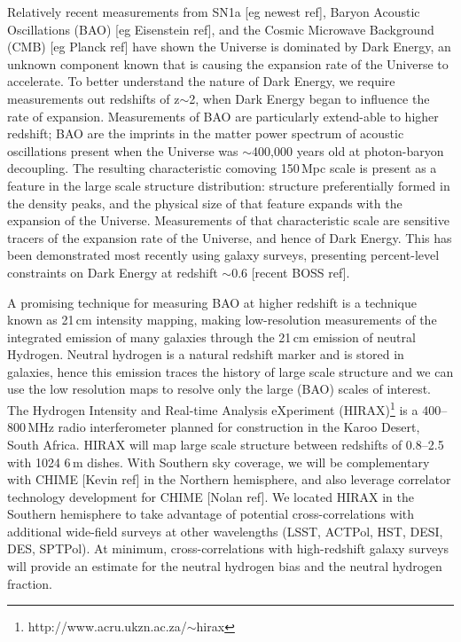 \documentclass[]{spie}  %
\begin{document}
Relatively recent measurements from SN1a [eg newest ref], Baryon Acoustic Oscillations (BAO) [eg Eisenstein ref], and the Cosmic Microwave Background (CMB) [eg Planck ref] have shown the Universe is dominated by Dark Energy, an unknown component known that is causing the expansion rate of the Universe to accelerate. To better understand the nature of Dark Energy, we require measurements out redshifts of z$\sim$2, when Dark Energy began to influence the rate of expansion. Measurements of BAO are particularly extend-able to higher redshift; BAO are the imprints in the matter power spectrum of acoustic oscillations present when the Universe was $\sim$400,000 years old at photon-baryon decoupling. The resulting characteristic comoving 150\,Mpc scale is present as a feature in the large scale structure distribution: structure preferentially formed in the density peaks, and the physical size of that feature expands with the expansion of the Universe. Measurements of that characteristic scale are sensitive tracers of the expansion rate of the Universe, and hence of Dark Energy. This has been demonstrated most recently using galaxy surveys, presenting percent-level constraints on Dark Energy at redshift $\sim$0.6 [recent BOSS ref]. \newline

A promising technique for measuring BAO at higher redshift is a technique known as 21\,cm intensity mapping, making low-resolution measurements of the integrated emission of many galaxies through the 21\,cm emission of neutral Hydrogen. Neutral hydrogen is a natural redshift marker and is stored in galaxies, hence this emission traces the history of large scale structure and we can use the low resolution maps to resolve only the large (BAO) scales of interest. The Hydrogen Intensity and Real-time Analysis eXperiment (HIRAX)\footnote{http:\//\//www.acru.ukzn.ac.za\//$\sim$hirax} is a 400--800\,MHz radio interferometer planned for construction in the Karoo Desert, South Africa. HIRAX will map large scale structure between redshifts of 0.8--2.5 with 1024 6\,m dishes. With Southern sky coverage, we will be complementary with CHIME [Kevin ref] in the Northern hemisphere, and also leverage correlator technology development for CHIME [Nolan ref]. We located HIRAX in the Southern hemisphere to take advantage of potential cross-correlations with additional wide-field surveys at other wavelengths (LSST, ACTPol, HST, DESI, DES, SPTPol). At minimum, cross-correlations with high-redshift galaxy surveys will provide an estimate for the neutral hydrogen bias and the neutral hydrogen fraction. \newline
\end{document}
